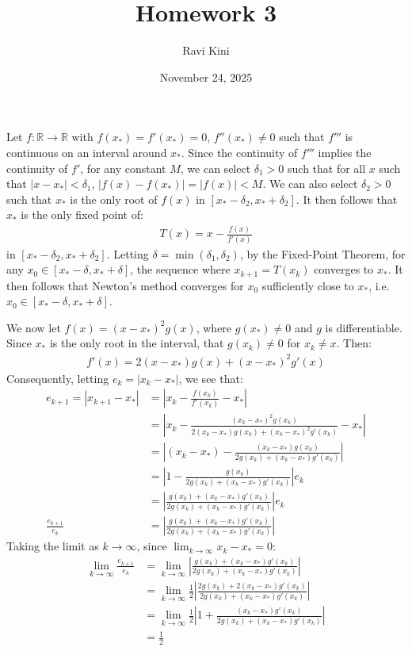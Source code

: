 \documentclass{article}
\title{Homework 3}
\author{Ravi Kini}
\date{November 24, 2025}
\begin{document}
\maketitle

\problem{}
Let $f : \mathbb{R} \to \mathbb{R}$ with $f(x_*) = f'(x_*) = 0$, $f''(x_*) \neq 0$ such that $f'''$ is continuous on an interval around $x_*$. Since the continuity of $f'''$ implies the continuity of $f'$, for any constant $M$, we can select $\delta_1 > 0$ such that for all $x$ such that $|x - x_*| < \delta_1$, $|f(x) - f(x_*)| = |f(x)| < M$. We can also select $\delta_2 > 0$ such that $x_*$ is the only root of $f(x)$ in $[x_* - \delta_2, x_* + \delta_2]$. It then follows that $x_*$ is the only fixed point of:
\begin{align*}
    T(x) = x - \frac{f(x)}{f'(x)}
\end{align*}
in $[x_* - \delta_2, x_* + \delta_2]$. Letting $\delta = \min(\delta_1, \delta_2)$, by the Fixed-Point Theorem, for any $x_0 \in [x_* - \delta, x_* + \delta]$, the sequence where $x_{k + 1} = T(x_k)$ converges to $x_*$. It then follows that Newton's method converges for $x_0$ sufficiently close to $x_*$, i.e. $x_0 \in [x_* - \delta, x_* + \delta]$.

We now let $f(x) = {(x - x_*)}^2g(x)$, where $g(x_*) \neq 0$ and $g$ is differentiable. Since $x_*$ is the only root in the interval, that $g(x_k) \neq 0$ for $x_k \neq x$. Then:
\begin{align*}
    f'(x) = 2(x - x_*)g(x) + {(x - x_*)}^2g'(x)
\end{align*}
Consequently, letting $e_k = |x_k - x_*|$, we see that:
\begin{align*}
    e_{k + 1} = |x_{k+1} - x_*| & = \left|x_k - \frac{f(x_k)}{f'(x_k)} - x_*\right| \\
    & = \left|x_k - \frac{{(x_k - x_*)}^2g(x_k)}{2(x_k - x_*)g(x_k) + {(x_k - x_*)}^2g'(x_k)} - x_*\right| \\
    & = \left|(x_k - x_*) - \frac{(x_k - x_*)g(x_k)}{2g(x_k) + (x_k - x_*)g'(x_k)}\right| \\
    & = \left|1 - \frac{g(x_k)}{2g(x_k) + (x_k - x_*)g'(x_k)}\right|e_k \\
    & = \left|\frac{g(x_k) + (x_k - x_*)g'(x_k)}{2g(x_k) + (x_k - x_*)g'(x_k)}\right|e_k \\
    \frac{e_{k+1}}{e_k} & = \left|\frac{g(x_k) + (x_k - x_*)g'(x_k)}{2g(x_k) + (x_k - x_*)g'(x_k)}\right|
\end{align*}
Taking the limit as $k \to \infty$, since $\lim_{k\to\infty} x_k - x_* = 0$:
\begin{align*}
    \lim_{k\to\infty} \frac{e_{k+1}}{e_k} & = \lim_{k\to\infty} \left|\frac{g(x_k) + (x_k - x_*)g'(x_k)}{2g(x_k) + (x_k - x_*)g'(x_k)}\right| \\
    & = \lim_{k\to\infty} \frac{1}{2}\left|\frac{2g(x_k) + 2(x_k - x_*)g'(x_k)}{2g(x_k) + (x_k - x_*)g'(x_k)}\right| \\
    & = \lim_{k\to\infty} \frac{1}{2}\left|1 + \frac{(x_k - x_*)g'(x_k)}{2g(x_k) + (x_k - x_*)g'(x_k)}\right| \\
    & = \frac{1}{2}
\end{align*}
\end{document}
